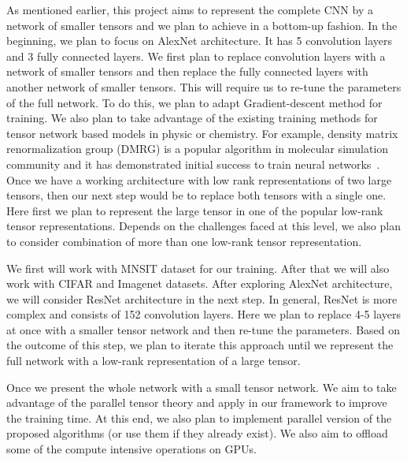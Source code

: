 As mentioned earlier, this project aims to represent the complete CNN by a network of smaller tensors and we plan to achieve in a bottom-up fashion. In the beginning, we plan to focus on AlexNet architecture. It has 5 convolution layers and 3 fully connected layers. We first plan to replace convolution layers with a network of smaller tensors and then replace the fully connected layers with another network of smaller tensors. This will require us to re-tune the parameters of the full network. To do this, we plan to adapt Gradient-descent method for training. We also plan to take advantage of the existing training methods for tensor network based models in physic or chemistry. For example, density matrix renormalization group (DMRG) is a popular algorithm in molecular simulation community and it has demonstrated initial success to train neural networks~\cite{SS-NIPS2016}. Once we have a working architecture with low rank representations of two large tensors, then our next step would be to replace both tensors with a single one. Here first we plan to represent the large tensor in one of the popular low-rank tensor representations. Depends on the challenges faced at this level, we also plan to consider combination of more than one low-rank tensor representation.    


We first will work with  MNSIT dataset for our training. After that we will also work with CIFAR and Imagenet datasets. After exploring AlexNet architecture, we will consider ResNet architecture in the next step. In general, ResNet is more complex and consists of 152 convolution layers. Here we plan to replace 4-5 layers at once with a smaller tensor network and then re-tune the parameters. Based on the outcome of this step, we plan to iterate this approach until we represent the full network with a low-rank representation of a large tensor.  

Once we present the whole network with a small tensor network. We aim to take advantage of the parallel tensor theory and apply in our framework to improve the training time. At this end, we also plan to implement parallel version of the proposed algorithms (or use them if they already exist). We also aim to offload some of the compute intensive operations on GPUs.   



